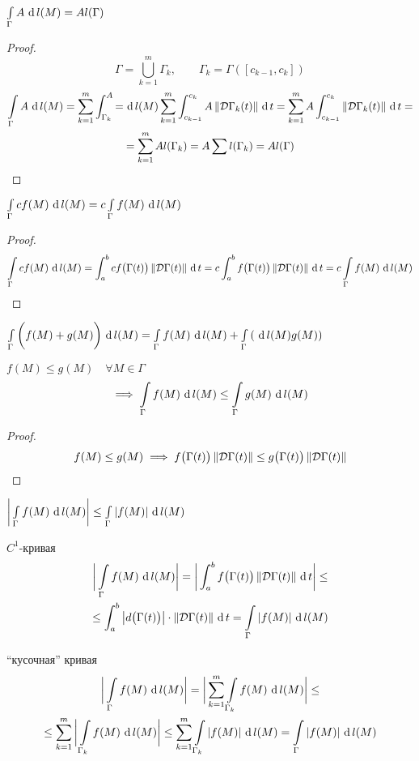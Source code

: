 \begin{props}
	\item $ \cint[l(M)]{\Gamma}{A} = Al(\Gamma) $
	\begin{proof}
		$$ \Gamma = \bigcup_{k = 1}^m \Gamma_k, \qquad \Gamma_k = \Gamma([c_{k - 1}, c_k]) $$
		\begin{multline*}
			\cint[l(M)]\Gamma A = \sum_{k = 1}^m \dint[l(M)]{\Gamma_k}A = \sum_{k = 1}^m \dint[t]{c_{k - 1}}{c_k}{A\norm{\mc D\Gamma_k(t)}} = \sum_{k = 1}^m A \dint[t]{c_{k - 1}}{c_k}{\norm{\mc D\Gamma_k(t)}} = \\
			= \sum_{k = 1}^mAl(\Gamma_k) = A\sum l(\Gamma_k) = Al(\Gamma)
		\end{multline*}
	\end{proof}
	\item $ \cint[l(M)]\Gamma{cf(M)} = c\cint[l(M)]\Gamma{f(M)} $
	\begin{proof}
		$$ \cint[l(M)]\Gamma{cf(M)} = \dint[t]ab{cf \big( \Gamma(t) \big)\norm{\mc D\Gamma(t)}} = c\dint[t]ab{f \big( \Gamma(t) \big) \norm{\mc D\Gamma(t)}} = c \cint[l(M)]\Gamma{f(M)} $$
	\end{proof}
	\item $ \cint\Gamma{\bigg( f(M) + g(M) \bigg)} = \cint\Gamma{f(M)} + \cint\Gamma(g(M)) $
	\item $ f(M) \le g(M) \quad \forall M \in \Gamma $
	$$ \implies \cint\Gamma{f(M)} \le \cint\Gamma{g(M)} $$
	\begin{proof}
		$$ f(M) \le g(M) \implies f \big( \Gamma(t) \big) \norm{\mc D\Gamma(t)} \le g \big( \Gamma(t) \big) \norm{\mc D\Gamma(t)} $$
	\end{proof}
	\item $ \bigg| \cint\Gamma{f(M)}\bigg| \le \cint\Gamma{|f(M)|} $
	\begin{iproof}
		\item $ C^1 $-кривая
		\begin{multline*}
			\bigg| \cint\Gamma{f(M)}\bigg| = \bigg| \dint[t]ab{ f \big( \Gamma(t) \big)\norm{\mc D\Gamma(t)}} \bigg| \le \\
			\le \dint[t]ab{\big| d \big( \Gamma(t) \big) \big| \cdot \norm{\mc D\Gamma(t)}} = \cint\Gamma{|f(M)|}
		\end{multline*}
		\item ``кусочная'' кривая
		\begin{multline*}
			\bigg| \cint\Gamma{f(M)} \bigg| = \bigg| \sum_{k = 1}^m \cint{\Gamma_k}{f(M)} \bigg| \le \\
			\le \sum_{k = 1}^m \bigg| \cint{\Gamma_k}{f(M)}\bigg| \le \sum_{k = 1}^m \cint{\Gamma_k}{|f(M)|} = \cint\Gamma{|f(M)|}
		\end{multline*}
	\end{iproof}
\end{props}

